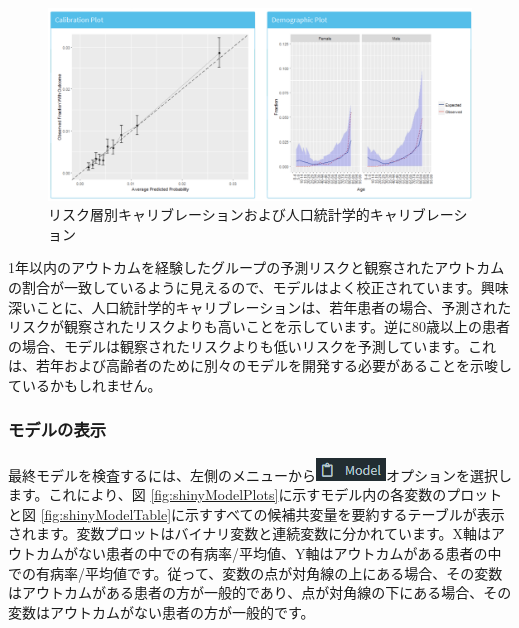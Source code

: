 \documentclass[
  11pt]{book}
\theoremstyle{definition}
\theoremstyle{definition}
\theoremstyle{definition}
\theoremstyle{definition}
\theoremstyle{remark}
\begin{document}
\begin{figure}

{\centering \includegraphics[width=1\linewidth]{images/PatientLevelPrediction/shiny/shinyPerformanceCal} 

}

\caption{リスク層別キャリブレーションおよび人口統計学的キャリブレーション}\label{fig:shinyPerformanceCal}
\end{figure}

1年以内のアウトカムを経験したグループの予測リスクと観察されたアウトカムの割合が一致しているように見えるので、モデルはよく校正されています。興味深いことに、人口統計学的キャリブレーションは、若年患者の場合、予測されたリスクが観察されたリスクよりも高いことを示しています。逆に80歳以上の患者の場合、モデルは観察されたリスクよりも低いリスクを予測しています。これは、若年および高齢者のために別々のモデルを開発する必要があることを示唆しているかもしれません。

\subsubsection*{モデルの表示}\label{ux30e2ux30c7ux30ebux306eux8868ux793a}

最終モデルを検査するには、左側のメニューから\includegraphics{images/PatientLevelPrediction/modelButton.png}オプションを選択します。これにより、図 \ref{fig:shinyModelPlots}に示すモデル内の各変数のプロットと図 \ref{fig:shinyModelTable}に示すすべての候補共変量を要約するテーブルが表示されます。変数プロットはバイナリ変数と連続変数に分かれています。X軸はアウトカムがない患者の中での有病率/平均値、Y軸はアウトカムがある患者の中での有病率/平均値です。従って、変数の点が対角線の上にある場合、その変数はアウトカムがある患者の方が一般的であり、点が対角線の下にある場合、その変数はアウトカムがない患者の方が一般的です。
\end{document}
